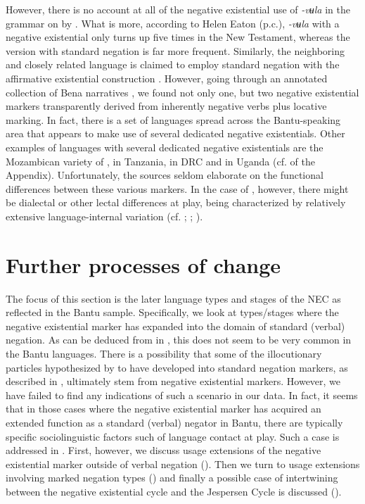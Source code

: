 \documentclass[output=paper,draft,draftmode,colorlinks,citecolor=brown]{langscibook}
\begin{document}
%
However, there is no account at all of the negative existential use of
\textit{-vʉla} in the grammar on  by \citet{Wolff1905}. What is
more, according to Helen Eaton (p.c.), \textit{-vʉla}
with a negative existential only turns up five times in the New Testament,
whereas the version with standard negation is far more frequent. Similarly,
the neighboring and closely related language  is claimed to
employ standard negation with the affirmative existential construction
\citep[378]{Morrison2011}. However, going through an annotated collection
of Bena narratives \citep{Eaton2015a}, we found not only one, but two
negative existential markers transparently derived from inherently negative
verbs plus locative marking.
%
In fact, there is a set of
languages spread across the Bantu-speaking area that appears to make use
of several dedicated negative existentials. Other examples of languages
with several dedicated negative existentials are the Mozambican variety of
,  in Tanzania,  in DRC and  in
Uganda (cf.  of the Appendix). Unfortunately, the sources seldom elaborate on the functional differences between these various
markers. In the case of , however, there might be dialectal or
other lectal differences at play,  being characterized by
relatively extensive language-internal variation (cf.
\citealt[30--35]{Morrison2011}; \citealt{Morrison2015};
\citealt{Mitterhofer2013}).

\section{Further processes of change}\label{sec:1:6}
%
The focus of this section is the later language types and stages of the NEC
as reflected in the Bantu sample. Specifically, we look at types\slash stages
where the negative existential marker has expanded into the domain of
standard (verbal) negation. As can be deduced from
 in , this does not seem to be 
very common in the Bantu languages. There is a possibility that some
of the illocutionary particles hypothesized by \citet{Guldemann1999} to
have developed into standard negation markers, as described in
, ultimately stem from negative existential markers.
However, we have failed to find any indications of such a scenario in our
data. In fact, it seems that in those cases where the negative existential
marker has acquired an extended function as a standard (verbal) negator in
Bantu, there are typically specific sociolinguistic factors such of
language contact at play. Such a case is addressed in
. First, however, we discuss usage extensions of the
negative existential marker outside of verbal negation
(). Then we turn to usage extensions involving marked
negation types () and finally a possible case of
intertwining between the negative existential cycle and the Jespersen
Cycle is discussed ().
\end{document}
